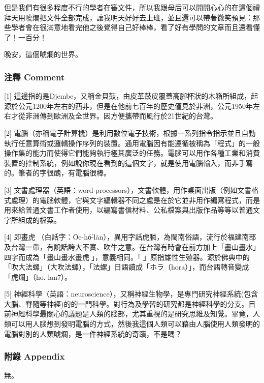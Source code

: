 \documentclass[
]{article}
\begin{document}
但是我們有很多程度不行的學者在審文件，所以我跟母后可以開開心心的在這個禮拜天用唬爛把文件全部完成，讓我明天好好去上班，並且還可以帶著微笑預見：那些學者會在很滿意地看完他之後覺得自己好棒棒，看了好有學問的文章而且還看懂了！一百分！

晚安，這個唬爛的世界。

\hypertarget{ux6ce8ux91cb-comment-1}{%
\subsubsection{注釋 Comment}\label{ux6ce8ux91cb-comment-1}}

{[}1{]}
這邊指的是Djembe，又稱金貝鼓，由皮革鼓皮覆蓋高腳杯狀的木箱所組成，起源於公元1200年左右的西非，但是在他前七百年的歷史僅見於非洲，公元1950年左右才從非洲傳到歐洲及全世界。因方便攜帶而風行於21世紀的台灣。

{[}2{]}
電腦（亦稱電子計算機）是利用數位電子技術，根據一系列指令指示並且自動執行任意算術或邏輯操作序列的裝置。通用電腦因有能遵循被稱為「程式」的一般操作集的能力而使得它們能夠執行極其廣泛的任務。電腦可以用作各種工業和消費裝置的控制系統，例如說你現在看到的這個文字，就是使用電腦輸入，而非手寫的。筆者的字很醜，有電腦很棒。

{[}3{]} 文書處理器（英語：word
processors），文書軟體，用作桌面出版（例如文書格式處理）的電腦軟體，它與文字編輯器不同之處是在於它並非用作編寫程式，而是用來給普通文書工作者使用，以編寫書信材料、公私檔案與出版作品等等以普通文字所組成的檔案。

{[}4{]}
即畫虎𡳞（白話字：Ōe-hó͘-lān），異用字話虎膦，為閩南俗語，流行於福建南部及台灣一帶，有說話誇大不實、吹牛之意。在台灣有時會在前方加上「畫山畫水」四字而成為「畫山畫水畫虎𡳞」，意義相同。「𡳞」原指雄性生殖器。源於佛典中的「吹大法螺」（大吹法螺），「法螺」日語讀成「ホラ（hora）」，而台語轉音變成「虎爛」（ho.-lan7）。

{[}5{]}
神經科學（英語：neuroscience），又稱神經生物學，是專門研究神經系統(包含大腦、脊隨等神經)的的一門科學。對行為及學習的研究都是神經科學的分支。目前神經科學最關心的議題是人類的腦部，尤其重視的是研究思維及知覺。畢竟，人類可以用人腦想到發明電腦的方式，然後我這個人類可以藉由人腦使用人類發明的電腦對別的人類唬爛，是一件神經系統的奇蹟，不是嗎？

\hypertarget{ux9644ux9304-appendix-1}{%
\subsubsection{附錄 Appendix}\label{ux9644ux9304-appendix-1}}

無。
\end{document}
